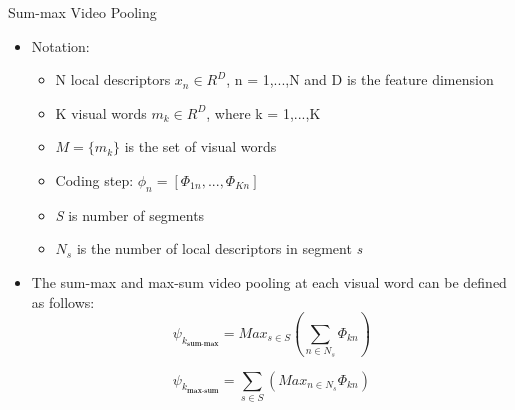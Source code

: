 \documentclass{beamer}
\begin{document}
\begin{frame}[t]{Sum-max Video Pooling}

\begin{itemize}
	\item Notation:
\begin{itemize}
\item N local descriptors $x_{n} \in R^{D}$, n = 1,...,N and D is the feature dimension
\item K visual words $m_{k} \in R^{D}$, where k = 1,...,K 
\item $M = \{m_{k}\}$ is the set of visual words
\item Coding step: $\phi_{n} = [\Phi_{1n},...,\Phi_{Kn}]$
\item \textit{S} is number of segments
\item $N_{s}$ is the number of local descriptors in segment \textit{s} 
\end{itemize}
\item The sum-max and max-sum video pooling at each visual word can be defined as follows:
\begin{equation}\psi_{k_{\textbf{sum-max}}} = Max_{s \in S}(\sum_{n \in N_{s}}\Phi_{kn})\end{equation}

\begin{equation}\psi_{k_{\textbf{max-sum}}} = \sum_{s \in S}(Max_{n \in N_{s}}\Phi_{kn})\end{equation}
\end{itemize}

\end{frame}
\end{document}
